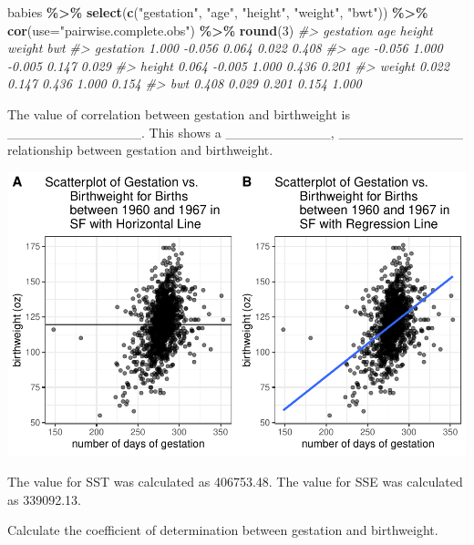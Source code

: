 \documentclass[
]{report}
\newenvironment{Shaded}{\begin{snugshade}}{\end{snugshade}}
\newcommand{\AttributeTok}[1]{\textcolor[rgb]{0.13,0.29,0.53}{#1}}
\newcommand{\CommentTok}[1]{\textcolor[rgb]{0.56,0.35,0.01}{\textit{#1}}}
\newcommand{\DecValTok}[1]{\textcolor[rgb]{0.00,0.00,0.81}{#1}}
\newcommand{\FunctionTok}[1]{\textcolor[rgb]{0.13,0.29,0.53}{\textbf{#1}}}
\newcommand{\NormalTok}[1]{#1}
\newcommand{\SpecialCharTok}[1]{\textcolor[rgb]{0.81,0.36,0.00}{\textbf{#1}}}
\newcommand{\StringTok}[1]{\textcolor[rgb]{0.31,0.60,0.02}{#1}}
\begin{document}
\begin{Shaded}
\begin{Highlighting}[]
\NormalTok{babies }\SpecialCharTok{\%\textgreater{}\%}
    \FunctionTok{select}\NormalTok{(}\FunctionTok{c}\NormalTok{(}\StringTok{"gestation"}\NormalTok{, }\StringTok{"age"}\NormalTok{, }\StringTok{"height"}\NormalTok{, }\StringTok{"weight"}\NormalTok{, }\StringTok{"bwt"}\NormalTok{)) }\SpecialCharTok{\%\textgreater{}\%}
    \FunctionTok{cor}\NormalTok{(}\AttributeTok{use=}\StringTok{"pairwise.complete.obs"}\NormalTok{) }\SpecialCharTok{\%\textgreater{}\%}
    \FunctionTok{round}\NormalTok{(}\DecValTok{3}\NormalTok{)}
\CommentTok{\#\textgreater{}           gestation    age height weight   bwt}
\CommentTok{\#\textgreater{} gestation     1.000 {-}0.056  0.064  0.022 0.408}
\CommentTok{\#\textgreater{} age          {-}0.056  1.000 {-}0.005  0.147 0.029}
\CommentTok{\#\textgreater{} height        0.064 {-}0.005  1.000  0.436 0.201}
\CommentTok{\#\textgreater{} weight        0.022  0.147  0.436  1.000 0.154}
\CommentTok{\#\textgreater{} bwt           0.408  0.029  0.201  0.154 1.000}
\end{Highlighting}
\end{Shaded}


The value of correlation between gestation and birthweight is \_\_\_\_\_\_\_\_\_\_\_\_\_\_. This shows a \_\_\_\_\_\_\_\_\_\_\_, \_\_\_\_\_\_\_\_\_\_\_\_\_ relationship between gestation and birthweight.


\begin{center}\includegraphics[width=0.7\linewidth]{04-LN04-two-quantitativeEDA_files/figure-latex/unnamed-chunk-6-1} \end{center}

The value for SST was calculated as 406753.48. The value for SSE was calculated as 339092.13.

Calculate the coefficient of determination between gestation and birthweight.
\end{document}
